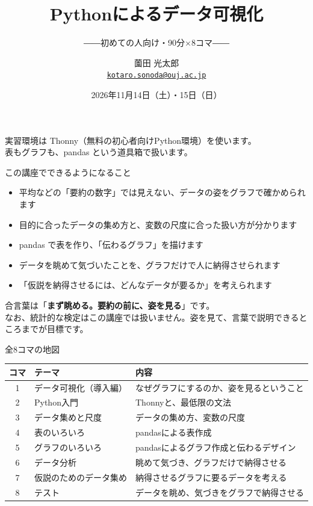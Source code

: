 \documentclass[aspectratio=169,11pt]{beamer}
\title{Pythonによるデータ可視化}
\subtitle{――初めての人向け・90分$\times$8コマ――}
\author{薗田 光太郎 \\ \href{mailto:kotaro.sonoda@ouj.ac.jp}{\texttt{kotaro.sonoda@ouj.ac.jp}}}
\institute{長崎大学病院 医療情報部}
\date{2026年11月14日（土）・15日（日）}
\begin{document}
\begin{frame}
\titlepage
\begin{center}
\small 実習環境は Thonny（無料の初心者向けPython環境）を使います。\\
表もグラフも、pandas という道具箱で扱います。
\end{center}
\end{frame}

\begin{frame}{この講座でできるようになること}
\begin{itemize}
\item 平均などの「要約の数字」では見えない、データの姿をグラフで確かめられます
\item 目的に合ったデータの集め方と、変数の尺度に合った扱い方が分かります
\item pandas で表を作り、「伝わるグラフ」を描けます
\item データを眺めて気づいたことを、グラフだけで人に納得させられます
\item 「仮説を納得させるには、どんなデータが要るか」を考えられます
\end{itemize}
\vspace{0.5em}
合言葉は「\textbf{まず眺める。要約の前に、姿を見る}」です。\\
なお、統計的な検定はこの講座では扱いません。姿を見て、言葉で説明できるところまでが目標です。
\end{frame}

\begin{frame}{全8コマの地図}
\begin{center}
\begin{tabular}{clp{7.8cm}}
\toprule
コマ & テーマ & 内容 \\
\midrule
1 & データ可視化（導入編） & なぜグラフにするのか、姿を見るということ \\
2 & Python入門 & Thonnyと、最低限の文法 \\
3 & データ集めと尺度 & データの集め方、変数の尺度 \\
4 & 表のいろいろ & pandasによる表作成 \\
5 & グラフのいろいろ & pandasによるグラフ作成と伝わるデザイン \\
6 & データ分析 & 眺めて気づき、グラフだけで納得させる \\
7 & 仮説のためのデータ集め & 納得させるグラフに要るデータを考える \\
8 & テスト & データを眺め、気づきをグラフで納得させる \\
\bottomrule
\end{tabular}
\end{center}
\end{frame}
\end{document}
